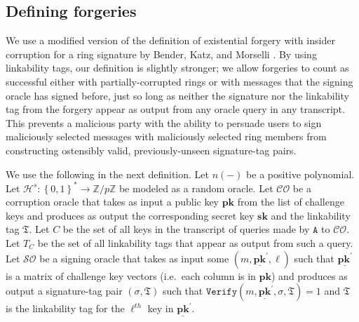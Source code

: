 \documentclass{article}
\theoremstyle{plain}
\theoremstyle{definition}
\begin{document}
\subsection{Defining forgeries}
We use a modified version of the definition of existential forgery with insider corruption for a ring signature by Bender, Katz, and Morselli \cite{bender}. By using linkability tags, our definition is slightly stronger; we allow forgeries to count as successful either with partially-corrupted rings or with messages that the signing oracle has signed before, just so long as neither the signature nor the linkability tag from the forgery appear as output from any oracle query in any transcript. This prevents a malicious party with the ability to persuade users to sign maliciously selected messages with maliciously selected ring members from constructing ostensibly valid, previously-unseen signature-tag pairs.

We use the following in the next definition. Let $n(-)$ be a positive polynomial. Let $\mathcal{H}^s:\left\{0,1\right\}^* \to \mathbb{Z}/p\mathbb{Z}$ be modeled as a random oracle. Let $\mathcal{CO}$ be a corruption oracle that takes as input a public key $\textbf{pk}$ from the list of challenge keys and produces as output the corresponding secret key $\textbf{sk}$ and the linkability tag $\mathfrak{T}$. Let $C$ be the set of all keys in the transcript of queries made by $\texttt{A}$ to $\mathcal{CO}$. Let $T_C$ be the set of all linkability tags that appear as output from such a query. Let $\mathcal{SO}$ be a signing oracle that takes as input some $(m, \underline{\textbf{pk}}^\prime, \ell)$ such that $\underline{\textbf{pk}^\prime}$ is a matrix of challenge key vectors (i.e.\ each column is in $\textbf{pk}$) and produces as output a signature-tag pair $(\sigma, \mathfrak{T})$ such that $\texttt{Verify}(m, \underline{\textbf{pk}}^\prime, \sigma, \mathfrak{T}) = 1$ and $\mathfrak{T}$ is the linkability tag for the $\ell^{th}$ key in $\underline{\textbf{pk}}^\prime$.
\end{document}

